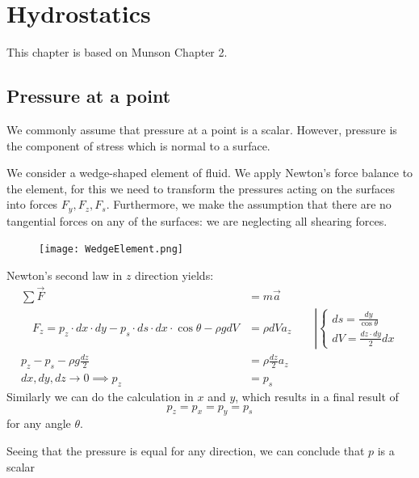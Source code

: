 \chapter{Hydrostatics}
This chapter is based on Munson Chapter 2.

\section{Pressure at a point}
\label{sec:pressure_at_point}
We commonly assume that pressure at a point is a scalar. However, pressure is the component of stress which is normal to a surface.

We consider a wedge-shaped element of fluid. We apply Newton's force balance to the element, for this we need to transform the pressures acting on the surfaces into forces $F_y,F_z,F_s$. Furthermore, we make the assumption that there are no tangential forces on any of the surfaces: we are neglecting all shearing forces.


\begin{figure}[H]
	\centering
	\texttt{[image: WedgeElement.png]}
\end{figure}

Newton's second law in $z$ direction yields:
\begin{equation*}
	\begin{split}
		\sum \vec F &= m \vec a \\
		\quad F_z = p_z\cdot dx\cdot dy - p_s \cdot ds\cdot dx\cdot \cos \theta-\rho g dV &= \rho dV a_z\qquad \left | \begin{cases}ds = \frac {dy} {\cos\theta}\\ dV = \frac{dz\cdot dy}{2}dx\end{cases}\right.\\
		p_z-p_s -\rho g \frac{dz}2 &= \rho \frac {dz}2a_z\\
		dx,dy,dz\to 0 \implies p_z&=p_s
	\end{split}
\end{equation*}
Similarly we can do the calculation in $x$ and $y$, which results in a final result of
$$
p_z=p_x=p_y=p_s
$$
for any angle $\theta$.

Seeing that the pressure is equal for any direction, we can conclude that $p$ is a scalar
